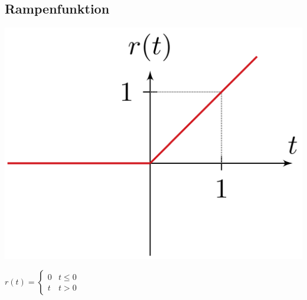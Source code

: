 		\subsection{Rampenfunktion}
		\begin{minipage}{0.2\textwidth}
			\includegraphics[width=\textwidth]{./bilder/funktionen/rampenF.png}
		\end{minipage}
		\qquad
		\begin{minipage}{0.45\textwidth}
			$r(t)=\begin{cases}
			{0} & {t \leq 0} \\ 
			{t} & {t>0}
			\end{cases}$
		\end{minipage}
		\qquad
		\begin{minipage}{0.25\textwidth}						
		\end{minipage}		
		
